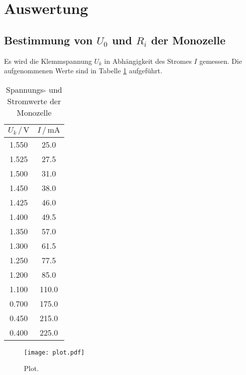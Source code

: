\section{Auswertung}
\label{sec:Auswertung}

\subsection{Bestimmung von $U_0$ und $R_i$ der Monozelle}

Es wird die Klemmspannung $U_k$ in Abhängigkeit des Stromes $I$ gemessen. 
Die aufgenommenen Werte sind in Tabelle \ref{tab:Monozelle} aufgeführt. 

\begin{table}
\centering
\caption{Spannungs- und Stromwerte der Monozelle}
\label{tab:Monozelle}
\begin{tabular}{c c}
\toprule
$U_k \,/\, \si{\volt}$ & $I \,/\, \si{\milli\ampere}$\\
\midrule
1.550 & 25.0\\
1.525 &  27.5\\
1.500 &  31.0\\
1.450 &  38.0\\
1.425 &  46.0\\
1.400 &  49.5\\
1.350 &  57.0\\
1.300 &  61.5\\
1.250 &  77.5\\
1.200 &  85.0\\
1.100 & 110.0\\
0.700 & 175.0\\
0.450 & 215.0\\
0.400 & 225.0\\
\bottomrule
\end{tabular}
\end{table}



\begin{figure}
  \centering
  \texttt{[image: plot.pdf]}
  \caption{Plot.}
  \label{fig:plot}
\end{figure}
